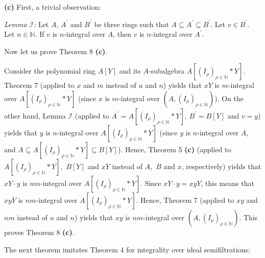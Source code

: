 \documentclass[12pt,final,notitlepage,onecolumn]{article}%
\begin{document}
\textbf{(c)} First, a trivial observation:

\textit{Lemma }$\mathcal{I}$\textit{:} Let $A$, $A^{\prime}$ and $B^{\prime}$
be three rings such that $A\subseteq A^{\prime}\subseteq B^{\prime}$. Let
$v\in B^{\prime}$. Let $n\in\mathbb{N}$. If $v$ is $n$-integral over $A$, then
$v$ is $n$-integral over $A^{\prime}$.

Now let us prove Theorem 8 \textbf{(c)}.

Consider the polynomial ring $A\left[  Y\right]  $ and its $A$-subalgebra
$A\left[  \left(  I_{\rho}\right)  _{\rho\in\mathbb{N}}\ast Y\right]  $.
Theorem 7 (applied to $x$ and $m$ instead of $u$ and $n$) yields that $xY$ is
$m$-integral over $A\left[  \left(  I_{\rho}\right)  _{\rho\in\mathbb{N}}\ast
Y\right]  $ (since $x$ is $m$-integral over $\left(  A,\left(  I_{\rho
}\right)  _{\rho\in\mathbb{N}}\right)  $). On the other hand, Lemma
$\mathcal{I}$ (applied to $A^{\prime}=A\left[  \left(  I_{\rho}\right)
_{\rho\in\mathbb{N}}\ast Y\right]  $, $B^{\prime}=B\left[  Y\right]  $ and
$v=y$) yields that $y$ is $n$-integral over $A\left[  \left(  I_{\rho}\right)
_{\rho\in\mathbb{N}}\ast Y\right]  $ (since $y$ is $n$-integral over $A$, and
$A\subseteq A\left[  \left(  I_{\rho}\right)  _{\rho\in\mathbb{N}}\ast
Y\right]  \subseteq B\left[  Y\right]  $). Hence, Theorem 5 \textbf{(c)}
(applied to $A\left[  \left(  I_{\rho}\right)  _{\rho\in\mathbb{N}}\ast
Y\right]  ,$ $B\left[  Y\right]  $ and $xY$ instead of $A,$ $B$ and $x$,
respectively) yields that $xY\cdot y$ is $nm$-integral over $A\left[  \left(
I_{\rho}\right)  _{\rho\in\mathbb{N}}\ast Y\right]  $. Since $xY\cdot y=xyY$,
this means that $xyY$ is $nm$-integral over $A\left[  \left(  I_{\rho}\right)
_{\rho\in\mathbb{N}}\ast Y\right]  $. Hence, Theorem 7 (applied to $xy$ and
$nm$ instead of $u$ and $n$) yields that $xy$ is $nm$-integral over $\left(
A,\left(  I_{\rho}\right)  _{\rho\in\mathbb{N}}\right)  $. This proves Theorem
8 \textbf{(c)}.

The next theorem imitates Theorem 4 for integrality over ideal semifiltrations:
\end{document}
